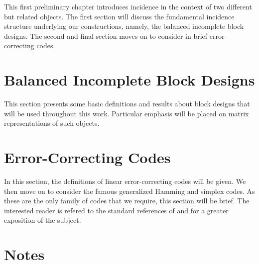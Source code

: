 \documentclass[../../main]{subfiles}
\begin{document}
This first preliminary chapter introduces incidence in the context of two different but related objects. The first section will discuss the fundamental incidence structure underlying our constructions, namely, the balanced incomplete block designs. The second and final section moves on to consider in brief error-correcting codes. 

 \section{\centering Balanced Incomplete Block Designs}
 
 This section presents some basic definitions and results about block designs that will be used throughout this work. Particular emphasis will be placed on matrix representations of such objects.
 
 \dinkus
 
 
 
 \section{\centering Error-Correcting Codes}
 
 In this section, the definitions of linear error-correcting codes will be given. We then move on to consider the famous generalized Hamming and simplex codes. As these are the only family of codes that we require, this section will be brief. The interested reader is refered to the standard references of \cite{pless-book} and \cite{error-correcting-codes-v1} for a greater exposition of the subject.
 
 \dinkus
 
 
 
 \singlespace
 
 \section*{\centering Notes}
 \theanotes
 
 \doublespacing
 
 \biblio
\end{document}
